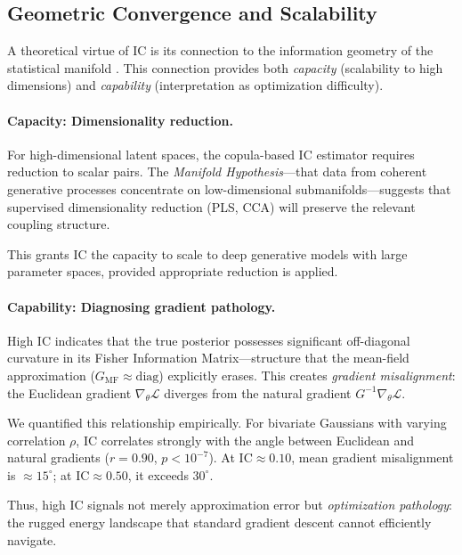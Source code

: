 \documentclass[10pt]{article} %
\theoremstyle{plain}
\theoremstyle{definition}
\newcommand{\IC}{\mathrm{IC}}  %
\begin{document}
\subsection{Geometric Convergence and Scalability}

A theoretical virtue of IC is its connection to the information geometry of the statistical manifold \citep{amari2016information}. This connection provides both \emph{capacity} (scalability to high dimensions) and \emph{capability} (interpretation as optimization difficulty).

\paragraph{Capacity: Dimensionality reduction.} For high-dimensional latent spaces, the copula-based IC estimator requires reduction to scalar pairs. The \emph{Manifold Hypothesis}---that data from coherent generative processes concentrate on low-dimensional submanifolds---suggests that supervised dimensionality reduction (PLS, CCA) will preserve the relevant coupling structure.

This grants IC the capacity to scale to deep generative models with large parameter spaces, provided appropriate reduction is applied.

\paragraph{Capability: Diagnosing gradient pathology.} High IC indicates that the true posterior possesses significant off-diagonal curvature in its Fisher Information Matrix---structure that the mean-field approximation ($G_{\text{MF}} \approx \text{diag}$) explicitly erases. This creates \emph{gradient misalignment}: the Euclidean gradient $\nabla_\theta \mathcal{L}$ diverges from the natural gradient $G^{-1}\nabla_\theta \mathcal{L}$.

We quantified this relationship empirically. For bivariate Gaussians with varying correlation $\rho$, IC correlates strongly with the angle between Euclidean and natural gradients ($r = 0.90$, $p < 10^{-7}$). At $\IC \approx 0.10$, mean gradient misalignment is $\approx 15^{\circ}$; at $\IC \approx 0.50$, it exceeds $30^{\circ}$.

Thus, high IC signals not merely approximation error but \emph{optimization pathology}: the rugged energy landscape that standard gradient descent cannot efficiently navigate.
\end{document}
